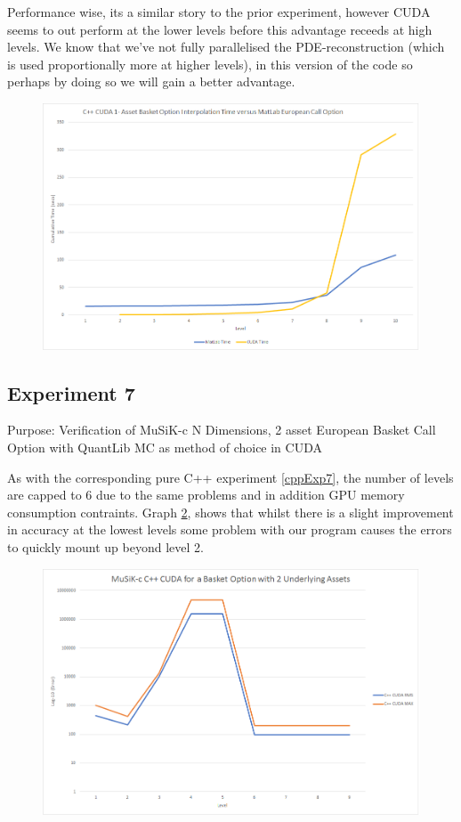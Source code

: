 \documentclass[a4paper]{amsart}
\begin{document}
Performance wise, its a similar story to the prior experiment, however CUDA seems to out perform at the lower levels before this advantage receeds at high levels. We know that we've not fully parallelised the PDE-reconstruction (which is used proportionally more at higher levels), in this version of the code so perhaps by doing so we will gain a better advantage.

\begin{figure}[h]
\centering
\includegraphics[scale=0.3]{cuExp5-time.png}
\caption {}
\label {fig:cuExp5t}
\end{figure}

\subsection{Experiment 7}\label{cuExp7}

Purpose: Verification of MuSiK-c N Dimensions, 2 asset European Basket Call Option with QuantLib MC as method of choice in CUDA

As with the corresponding pure C++ experiment \ref{cppExp7}, the number of levels are capped to 6 due to the same problems and in addition GPU memory consumption contraints. Graph \ref{fig:cuExp7e}, shows that whilst there is a slight improvement in accuracy at the lowest levels some problem with our program causes the errors to quickly mount up beyond level 2.

\begin{figure}[h]
\centering
\includegraphics[scale=0.3]{cuExp7-errors.png}
\caption {}
\label {fig:cuExp7e}
\end{figure}
\end{document}
